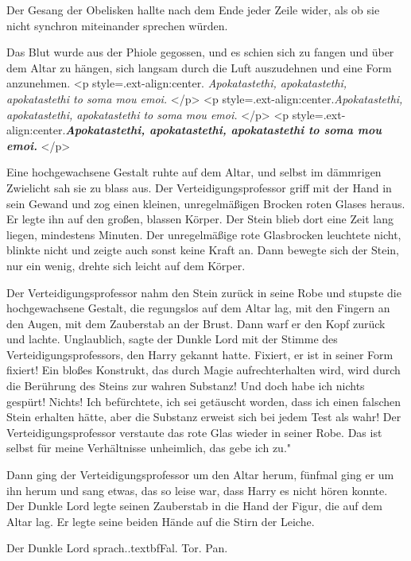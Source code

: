 Der Gesang der Obelisken hallte nach dem Ende jeder Zeile wider, als ob sie
nicht synchron miteinander sprechen würden.

Das Blut wurde aus der Phiole gegossen, und es schien sich zu fangen und über
dem Altar zu hängen, sich langsam durch die Luft auszudehnen und eine Form
anzunehmen. <p style=\grqq{}.ext-align:center\grqq{}. \emph{Apokatastethi,
apokatastethi, apokatastethi to soma mou emoi. }</p> <p
style=\grqq{}.ext-align:center\grqq{}.\emph{Apokatastethi, apokatastethi,
apokatastethi to soma mou emoi. }</p> <p
style=\grqq{}.ext-align:center\grqq{}.\textbf{\emph{Apokatastethi,
apokatastethi, apokatastethi to soma mou emoi. }}</p>

Eine hochgewachsene Gestalt ruhte auf dem Altar, und selbst im dämmrigen
Zwielicht sah sie zu blass aus. Der Verteidigungsprofessor griff mit der Hand in
sein Gewand und zog einen kleinen, unregelmäßigen Brocken roten Glases heraus.
Er legte ihn auf den großen, blassen Körper. Der Stein blieb dort eine Zeit lang
liegen, mindestens Minuten. Der unregelmäßige rote Glasbrocken leuchtete nicht,
blinkte nicht und zeigte auch sonst keine Kraft an. Dann bewegte sich der Stein,
nur ein wenig, drehte sich leicht auf dem Körper.

Der Verteidigungsprofessor nahm den Stein zurück in seine Robe und stupste die
hochgewachsene Gestalt, die regungslos auf dem Altar lag, mit den Fingern an den
Augen, mit dem Zauberstab an der Brust. Dann warf er den Kopf zurück und lachte.
\glqq Unglaublich\grqq{}, sagte der Dunkle Lord mit der Stimme des
Verteidigungsprofessors, den Harry gekannt hatte. \glqq Fixiert, er ist in
seiner Form fixiert! Ein bloßes Konstrukt, das durch Magie aufrechterhalten
wird, wird durch die Berührung des Steins zur wahren Substanz! Und doch habe ich
nichts gespürt! Nichts! Ich befürchtete, ich sei getäuscht worden, dass ich
einen falschen Stein erhalten hätte, aber die Substanz erweist sich bei jedem
Test als wahr!\grqq{} Der Verteidigungsprofessor verstaute das rote Glas wieder
in seiner Robe. \glqq Das ist selbst für meine Verhältnisse unheimlich, das gebe
ich zu."

Dann ging der Verteidigungsprofessor um den Altar herum, fünfmal ging er um ihn
herum und sang etwas, das so leise war, dass Harry es nicht hören konnte. Der
Dunkle Lord legte seinen Zauberstab in die Hand der Figur, die auf dem Altar
lag. Er legte seine beiden Hände auf die Stirn der Leiche.

Der Dunkle Lord sprach.\grqq{}.textbf{Fal. Tor. Pan}.\grqq{}

